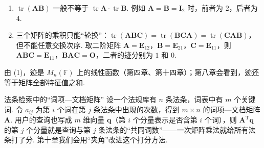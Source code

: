 \documentclass[lang=cn,10.5pt,scheme=chinese,toc=twocol,section,chinesefont=nofont,
twoside,citestyle=gb7714-2015,bibstyle=gb7714-2015]{elegantbook}
\DeclareRobustCommand{\textbf}[1]{{\lnsemiboldlatin\lnsemiboldcjk #1}}
\newcommand{\vv}[1]{\boldsymbol{#1}}
\newcommand{\trans}{\mathrm{T}}             %
\numberwithin{equation}{section}   %
\providecommand{\tr}{\operatorname{tr}}     %
\begin{document}
\begin{pitfallbox}
  \begin{enumerate}
    \item $\tr(\vv{AB})$ 一般不等于 $\tr\vv A\cdot\tr\vv B$. 例如 $\vv A=\vv B=\vv I_2$ 时，前者为 $2$，后者为 $4$.
    \item 三个矩阵的乘积只能“轮换”：$\tr(\vv{ABC})=\tr(\vv{BCA})=\tr(\vv{CAB})$，但不能任意交换次序. 取二阶矩阵 $\vv A=\vv E_{12}$，$\vv B=\vv E_{21}$，$\vv C=\vv E_{11}$，则 $\vv{ABC}=\vv E_{11}$，$\vv{BAC}=\vv O$，二者的迹分别为 $1$ 和 $0$.
  \end{enumerate}
\end{pitfallbox}

由 (1)，迹是 $M_n(\mathbb{F})$ 上的线性函数（第四章、第十四章）；第八章会看到，迹还等于矩阵全部特征值之和.
\begin{linkbox}{法条检索中的“词项—文档矩阵”}
  设一个法规库有 $n$ 条法条，词表中有 $m$ 个关键词. 令 $a_{ij}$ 为第 $i$ 个词在第 $j$ 条法条中出现的次数，得到 $m\times n$ 的\textbf{词项—文档矩阵} $\vv A$. 用户的查询也写成 $m$ 维向量 $\vv q$（第 $i$ 个分量表示是否含第 $i$ 个词），则 $\vv A^\trans\vv q$ 的第 $j$ 个分量就是查询与第 $j$ 条法条的“共同词数”——一次矩阵乘法就给所有法条打了分. 第十章我们会用“夹角”改进这个打分方法.
\end{linkbox}
\end{document}
